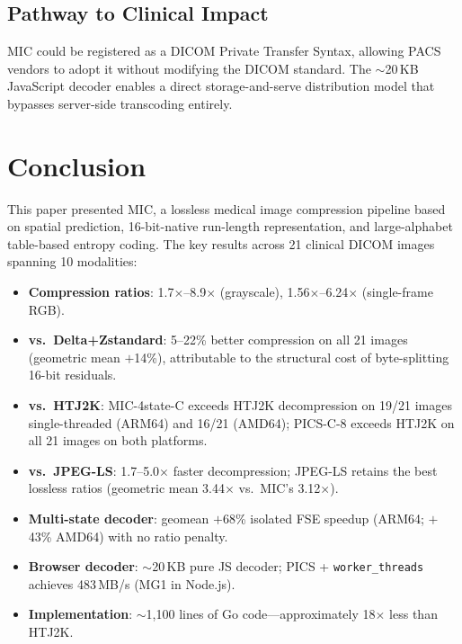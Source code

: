 \documentclass[journal]{IEEEtran}
\begin{document}
\subsection{Pathway to Clinical Impact}

MIC could be registered as a DICOM Private Transfer Syntax, allowing PACS
vendors to adopt it without modifying the DICOM standard. The ${\sim}$20\,KB
JavaScript decoder enables a direct storage-and-serve distribution model that
bypasses server-side transcoding entirely.

\section{Conclusion}
\label{sec:conclusion}

This paper presented MIC, a lossless medical image compression pipeline based on
spatial prediction, 16-bit-native run-length representation, and large-alphabet
table-based entropy coding. The key results across 21 clinical DICOM images
spanning 10 modalities:

\begin{itemize}
  \item \textbf{Compression ratios}: 1.7$\times$--8.9$\times$ (grayscale),
  1.56$\times$--6.24$\times$ (single-frame RGB).

  \item \textbf{vs.\ Delta+Zstandard}: 5--22\% better compression on all 21
  images (geometric mean $+$14\%), attributable to the structural cost of
  byte-splitting 16-bit residuals.

  \item \textbf{vs.\ HTJ2K}: MIC-4state-C exceeds HTJ2K decompression on 19/21
  images single-threaded (ARM64) and 16/21 (AMD64); PICS-C-8 exceeds HTJ2K on
  all 21 images on both platforms.

  \item \textbf{vs.\ JPEG-LS}: 1.7--5.0$\times$ faster decompression; JPEG-LS
  retains the best lossless ratios (geometric mean 3.44$\times$ vs.\ MIC's
  3.12$\times$).

  \item \textbf{Multi-state decoder}: geomean $+$68\% isolated FSE speedup
  (ARM64; $+$43\% AMD64) with no ratio penalty.

  \item \textbf{Browser decoder}: ${\sim}$20\,KB pure JS decoder; PICS +
  \texttt{worker\_threads} achieves 483\,MB/s (MG1 in Node.js).

  \item \textbf{Implementation}: ${\sim}$1,100 lines of Go
  code---approximately 18$\times$ less than HTJ2K.
\end{itemize}
\end{document}
